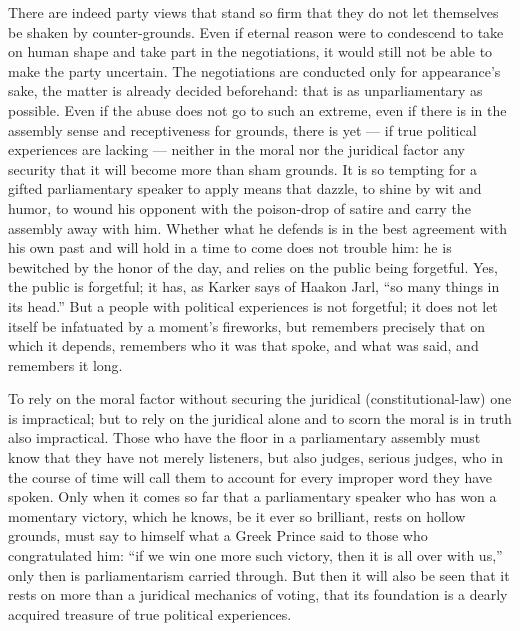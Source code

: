 \documentclass[12pt,a4paper,openany]{book}
\newcommand{\opage}[1]{\marginnote{\footnotesize\textit{[#1]}}}
\begin{document}
There are indeed party views that stand so firm that
they do not let themselves be shaken by counter-grounds. Even if
eternal reason were to condescend to take on human shape
and take part in the negotiations, it would
still not be able to make the party uncertain. The negotiations
are conducted only for appearance's sake, the matter is already
decided beforehand: that is as unparliamentary
as possible. Even if the abuse does not go to such
\setcounter{footnote}{0}%
\opage{52}an extreme, even if there is in the assembly
sense and receptiveness for grounds, there is yet ---
if true political experiences are lacking --- neither
in the moral nor the juridical factor any security
that it will become more than sham grounds. It is so
tempting for a gifted parliamentary speaker to apply
means that dazzle, to shine by wit and humor, to
wound his opponent with the poison-drop of satire and carry
the assembly away with him. Whether what he defends is in the
best agreement with his own past and will
hold in a time to come does not trouble him:
he is bewitched by the honor of the day, and relies on the public %
being forgetful. Yes, the public is forgetful; it
has, as Karker says of Haakon Jarl, ``so many things
in its head.'' But a people with political experiences is
not forgetful; it does not let itself be infatuated by a moment's
fireworks, but remembers precisely that on which it
depends, remembers who it was that spoke, and what
was said, and remembers it long.

To rely on the moral factor without securing
the juridical (constitutional-law) one is impractical; but to
rely on the juridical alone and to scorn the
moral is in truth also impractical. Those who have
the floor in a parliamentary assembly must know that they
have not merely listeners, but also judges, serious
judges, who in the course of time will call them to
account for every improper word they have spoken.
Only when it comes so far that a parliamentary speaker
who has won a momentary victory, which he
knows, be it ever so brilliant, rests
on hollow grounds, must say to himself what a Greek
\setcounter{footnote}{0}%
\opage{53}Prince said to those who congratulated him: ``if we win one more such
victory, then it is all over with us,'' only then is
parliamentarism carried through. But then it will also
be seen that it rests on more than a juridical mechanics of voting,
that its foundation is a dearly acquired
treasure of true political experiences.
\end{document}
